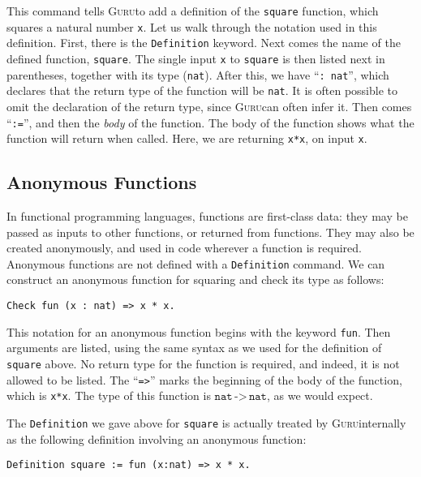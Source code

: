 \documentclass{book}[12pt]
\newcommand{\guru}[0]{\textsc{Guru}}
\begin{document}
\noindent This command tells \guru to add a definition of the
\texttt{square} function, which squares a natural number \texttt{x}.
Let us walk through the notation used in this definition.  First,
there is the \texttt{Definition} keyword.  Next comes the name of the
defined function, \texttt{square}.  The single input \texttt{x} to
\texttt{square} is then listed next in parentheses, together with its
type (\texttt{nat}).  After this, we have ``\texttt{: nat}'', which
declares that the return type of the function will be \texttt{nat}.
It is often possible to omit the declaration of the return type, since
\guru can often infer it.  Then comes ``\texttt{:=}'', and then the
\emph{body} of the function.  The body of the function shows what the
function will return when called.  Here, we are returning
\texttt{x*x}, on input \texttt{x}.

\subsection{Anonymous Functions}

In functional programming languages, functions are first-class data:
they may be passed as inputs to other functions, or returned from
functions.  They may also be created anonymously, and used in code
wherever a function is required.  Anonymous functions are not defined
with a \texttt{Definition} command.  We can construct an anonymous
function for squaring and check its type as follows:

\begin{verbatim}
Check fun (x : nat) => x * x.
\end{verbatim}

\noindent This notation for an anonymous function begins with the
keyword \texttt{fun}.  Then arguments are listed, using the same
syntax as we used for the definition of \texttt{square} above.  No
return type for the function is required, and indeed, it is not
allowed to be listed.  The ``\texttt{=>}'' marks the beginning of the
body of the function, which is \texttt{x*x}.  The type of this function
is $\texttt{nat}\,\texttt{->}\,\texttt{nat}$, as we would expect.

The \texttt{Definition} we gave above for \texttt{square} is actually
treated by \guru internally as the following definition involving an
anonymous function:

\begin{verbatim}
Definition square := fun (x:nat) => x * x.
\end{verbatim}
\end{document}
